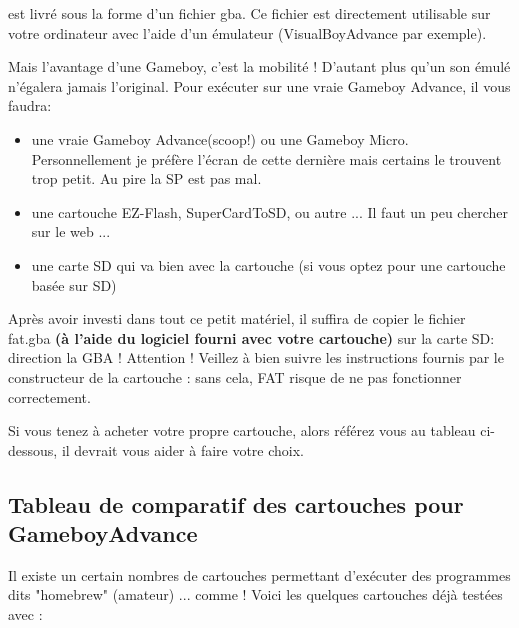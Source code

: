 \documentclass[12pt,a4paper]{article}
\begin{document}
    \FAT est livré sous la forme d'un fichier gba.
    Ce fichier est directement utilisable sur votre ordinateur avec l'aide d'un émulateur (VisualBoyAdvance par exemple).
    \medskip
    
    Mais l'avantage d'une Gameboy, c'est la mobilité !
    D'autant plus qu'un son émulé n'égalera jamais l'original.
    Pour exécuter \FAT sur une vraie Gameboy Advance, il vous faudra:
    \begin{itemize}
        \item{une vraie Gameboy Advance(scoop!) ou une Gameboy Micro. Personnellement je préfère l'écran de cette dernière mais certains le trouvent trop petit. Au pire la SP est pas mal.}
        \item{une cartouche EZ-Flash, SuperCardToSD, ou autre ... Il faut un peu chercher sur le web ...}
        \item{une carte SD qui va bien avec la cartouche (si vous optez pour une cartouche basée sur SD)} 
    \end{itemize}\medskip
    
    Après avoir investi dans tout ce petit matériel, il suffira de copier le fichier fat.gba {\bf (à l'aide du logiciel fourni avec votre cartouche)} sur la carte SD: direction la GBA !
    Attention ! Veillez à bien suivre les instructions fournis par le constructeur de la cartouche : sans cela, FAT risque de ne pas fonctionner correctement.
    
    
    Si vous tenez à acheter votre propre cartouche, alors référez vous au tableau ci-dessous, il devrait vous aider à faire votre choix.
    
    \subsection{Tableau de comparatif des cartouches pour GameboyAdvance}
    
    Il existe un certain nombres de cartouches permettant d'exécuter des programmes dits "homebrew" (amateur) ... comme \FAT !
    Voici les quelques cartouches déjà testées avec \FAT :
    \medskip
\end{document}
